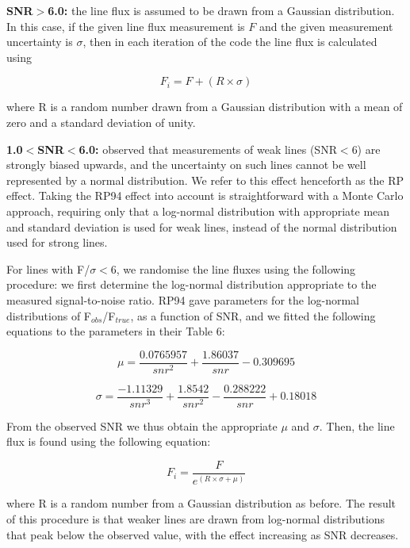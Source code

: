 \documentclass[useAMS,usenatbib]{mn2e}
\begin{document}
{\bf SNR$>$6.0: } the line flux is assumed to be drawn from a Gaussian distribution.  In this case, if the given line flux measurement is $F$ and the given measurement uncertainty is $\sigma$, then in each iteration of the code the line flux is calculated using

\begin{equation}
F_i = F + (R\times\sigma)
\end{equation}

where R is a random number drawn from a Gaussian distribution with a mean of zero and a standard deviation of unity.

{\bf 1.0$<$SNR$<$6.0: } \citet[][hereafter RP94]{1994A&A...287..676R} observed that measurements of weak lines (SNR$<$6) are strongly biased upwards, and the uncertainty on such lines cannot be well represented by a normal distribution.  We refer to this effect henceforth as the RP effect.  Taking the RP94 effect into account is straightforward with a Monte Carlo approach, requiring only that a log-normal distribution with appropriate mean and standard deviation is used for weak lines, instead of the normal distribution used for strong lines.

For lines with F/$\sigma < $6, we randomise the line fluxes using the following procedure: we first determine the log-normal distribution appropriate to the measured signal-to-noise ratio.  RP94 gave parameters for the log-normal distributions of F$_{obs}$/F$_{true}$, as a function of SNR, and we fitted the following equations to the parameters in their Table 6:

\begin{equation}
\mu = \frac{0.0765957}{snr^2} + \frac{1.86037}{snr} - 0.309695
\end{equation}

\begin{equation}
\sigma = \frac{-1.11329}{snr^3} + \frac{1.8542}{snr^2} - \frac{0.288222}{snr} + 0.18018
\end{equation}

From the observed SNR we thus obtain the appropriate $\mu$ and $\sigma$.  Then, the line flux is found using the following equation:

\begin{equation}
F_i = \frac{F}{e^{(R\times\sigma + \mu)}}
\end{equation}

where R is a random number from a Gaussian distribution as before.  The result of this procedure is that weaker lines are drawn from log-normal distributions that peak below the observed value, with the effect increasing as SNR decreases.
\end{document}

